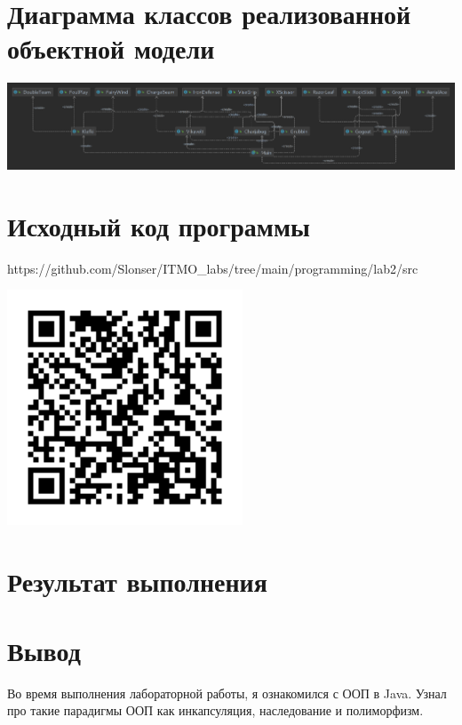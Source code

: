 \documentclass[12pt,onecolumn]{article}
\begin{document}
\newpage
\section{Диаграмма классов реализованной объектной модели}
\includegraphics[width=\columnwidth]{img/model.png}
\newpage
\section{Исходный код программы}
https://github.com/Slonser/ITMO\_labs/tree/main/programming/lab2/src
\begin{center}
  \includegraphics[width=7cm]{img/qr-code.png}
\end{center}

\newpage
\section{Результат выполнения}

\newpage
\section{Вывод}
Во время выполнения лабораторной работы, я ознакомился с ООП в Java. Узнал про такие парадигмы ООП как инкапсуляция, наследование и полиморфизм.
\end{document}
